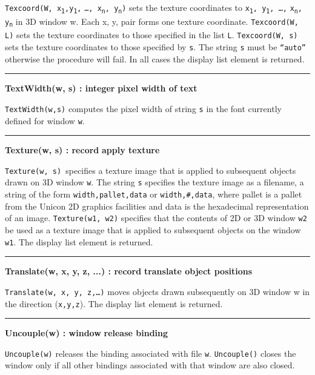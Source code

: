 \noindent
\texttt{Texcoord(W, x\textsubscript{1},y\textsubscript{1},}
\texttt{{\dots}, x\textsubscript{n}, y\textsubscript{n})}
sets the texture coordinates to
\texttt{x\textsubscript{1}, y\textsubscript{1}, {\dots},}
\texttt{x\textsubscript{n}, y\textsubscript{n}} in
3D window w. Each x, y, pair forms one texture coordinate.
\texttt{Texcoord(W, L)} sets the texture coordinates to those specified
in the list \texttt{L}. \texttt{Texcoord(W, s) }sets the texture
coordinates to those specified by \texttt{s}. The string \texttt{s}
must be \texttt{{\textquotedblleft}auto{\textquotedblright}} otherwise
the procedure will fail. In all cases the display list element is
returned.

\bigskip\hrule\vspace{0.1cm}
\noindent
{\bf TextWidth(w, s) : integer } \hfill {\bf pixel width of text}

\noindent
\texttt{TextWidth(w,s)} computes the pixel width of string \texttt{s} in
the font currently defined for window \texttt{w}.

\bigskip\hrule\vspace{0.1cm}
\noindent
{\bf Texture(w, s) : record } \hfill {\bf apply texture}

\noindent
\texttt{Texture(w, s) }specifies a texture image that is applied to
subsequent objects drawn on 3D window \texttt{w}. The string \texttt{s}
specifies the texture image as a filename, a string of the form
\texttt{width,pallet,data} or \texttt{width,\#,data}, where pallet is a
pallet from the Unicon 2D graphics facilities and data is the
hexadecimal representation of an image. \texttt{Texture(w1, w2)}
specifies that the contents of 2D or 3D window \texttt{w2} be used as
a texture image that is applied to subsequent objects on the window
\texttt{w1}. The display list element is returned.

\bigskip\hrule\vspace{0.1cm}
\noindent
{\bf Translate(w, x, y, z, ...) : record } \hfill {\bf translate object positions}

\noindent
\texttt{Translate(w, x, y, z,{\dots})} moves objects drawn subsequently
on 3D window w in the direction (\texttt{x,y,z}). The display list
element is returned.

\bigskip\hrule\vspace{0.1cm}
\noindent
{\bf Uncouple(w) : window } \hfill {\bf release binding}

\noindent
\texttt{Uncouple(w)} releases the binding associated with file
\texttt{w}. \texttt{Uncouple()} closes the window only if all other
bindings associated with that window are also closed.

